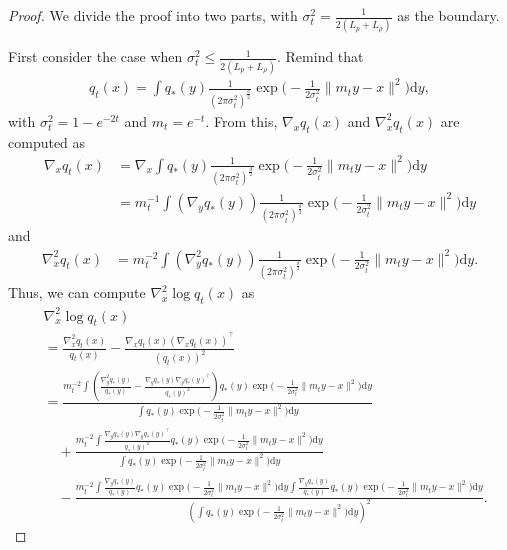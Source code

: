 \begin{proof}
    We divide the proof into two parts, with $\sigma_t^2 = \frac{1}{2(L_p + L_\rho)}$ as the boundary.
    
    First consider the case when $\sigma_t^2 \leq \frac{1}{2(L_p + L_\rho)}$. 
    Remind that
    \begin{align}
        q_t (x) = \int q_*(y)\frac{1}{(2\pi\sigma_t^2)^{\frac{d}{2}}}\exp\bigg(-\frac{1}{2\sigma_t^2}\|m_t y - x\|^2\bigg)\mathrm{d}y,
    \end{align}
    with $\sigma_t^2 = 1-e^{-2t}$ and $m_t = e^{-t}$. 
    From this, $\nabla_x q_t(x)$ and $\nabla_x^2 q_t(x)$ are computed as
    \begin{align}
        \nabla_x q_t(x) &= \nabla_x \int q_*(y)\frac{1}{(2\pi\sigma_t^2)^{\frac{d}{2}}}\exp\big(-\frac{1}{2\sigma_t^2}\|m_t y - x\|^2\big)\mathrm{d}y 
        \\ &= m_t^{-1}\int(\nabla_y q_*(y))\frac{1}{(2\pi\sigma_t^2)^{\frac{d}{2}}}\exp\big(-\frac{1}{2\sigma_t^2}\|m_t y - x\|^2\big)\mathrm{d}y
    \end{align}
    and
    \begin{align}
        \nabla_x^2 q_t(x) 
       & = m_t^{-2}\int(\nabla_y^2 q_*(y))\frac{1}{(2\pi\sigma_t^2)^{\frac{d}{2}}}\exp\big(-\frac{1}{2\sigma_t^2}\|m_t y - x\|^2\big)\mathrm{d}y
       .
    \end{align}
    Thus, we can compute $\nabla^2_x \log q_t(x)$ as
    \begin{align}
      &  \nabla^2_x \log q_t (x) 
      \\ &= \frac{\nabla^2_x q_t (x)}{q_t (x)} - \frac{\nabla_x q_t (x)(\nabla_x q_t (x))^\top }{(q_t (x))^2}
    \\ &= \frac{ m_t^{-2} \int (\frac{\nabla_y^2 q_*(y)}{q_*(y)}-\frac{\nabla_y q_*(y)\nabla_y q_*(y)^\top}{q_*(y)^2})q_*(y)\exp\big(-\frac{1}{2\sigma_t^2}\|m_t y - x\|^2\big)\mathrm{d}y}{\int q_*(y)\exp\big(-\frac{1}{2\sigma_t^2}\|m_t y - x\|^2\big)\mathrm{d}y}
    \label{eq:Appendix-Diffusion-Smoothness-1}
    \\ &\quad + \frac{ m_t^{-2} \int \frac{\nabla_y q_*(y)\nabla_y q_*(y)^\top}{q_*(y)^2} q_*(y)\exp\big(-\frac{1}{2\sigma_t^2}\|m_t y - x\|^2\big)\mathrm{d}y}{\int q_*(y)\exp\big(-\frac{1}{2\sigma_t^2}\|m_t y - x\|^2\big)\mathrm{d}y}
    \label{eq:Appendix-Diffusion-Smoothness-2}
       \\ &\quad -\frac{m_t^{-2} \int \frac{\nabla_y q_*(y)}{q_*(y)}q_*(y)\exp\big(-\frac{1}{2\sigma_t^2}\|m_t y - x\|^2\big)\mathrm{d}y\int \frac{\nabla_y q_*(y)}{q_*(y)}q_*(y)\exp\big(-\frac{1}{2\sigma_t^2}\|m_t y - x\|^2\big)\mathrm{d}y}{(\int q_*(y)\exp\big(-\frac{1}{2\sigma_t^2}\|m_t y - x\|^2\big)\mathrm{d}y)^2}.

\end{align}
\end{proof}
